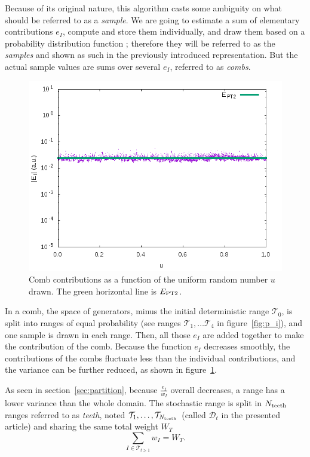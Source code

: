 \documentclass[./thesis.tex]{subfiles}
\begin{document}
Because of its original nature, this algorithm casts some ambiguity on what should be referred to as a \emph{sample}. We are going to estimate a sum of elementary contributions $e_I$, compute and store them individually, and draw them based on a probability distribution function ; therefore they will be referred to as the \emph{samples} and shown as such in the previously introduced representation. But the actual sample values are sums over several $e_I$, referred to as \emph{combs}.

\begin{figure}[h!]
	\begin{center}
		\includegraphics[width=0.7\columnwidth]{figures/pt2/comb_variance}
	\end{center}
		\caption{Comb contributions as a function of the uniform random number $u$ drawn. The green horizontal line is $E_\text{PT2}$.}
		\label{fig:ei_comb}
\end{figure}
In a comb, the space of generators, minus the initial deterministic range $\mathcal{T}_0$, is split into ranges of equal probability (see
ranges $\mathcal{T}_1, \dots \mathcal{T}_4$ in figure~\ref{fig:p_i}), and
one sample is drawn in each range. Then, all those $e_I$ are added together to make the contribution of the comb. Because the function $e_I$ decreases smoothly, the contributions of the combs fluctuate less than the individual contributions, and the variance can be further reduced, as shown in figure~\ref{fig:ei_comb}.

As seen in section~\ref{sec:partition}, because $\frac{e_I}{w_I}$ overall decreases, a range has a lower variance than the whole domain. The stochastic range is split in $N_\text{teeth}$ ranges referred to as \emph{teeth}, noted $\mathcal{T}_1,\ldots,\mathcal{T}_{N_\text{teeth}}$ (called $\mathcal{D}_t$ in the presented article) and sharing the same total weight $W_T$
\begin{equation}
\sum_{I \in \mathcal{T}_{t \geq 1}} w_I=W_T.
\end{equation}
\end{document}
